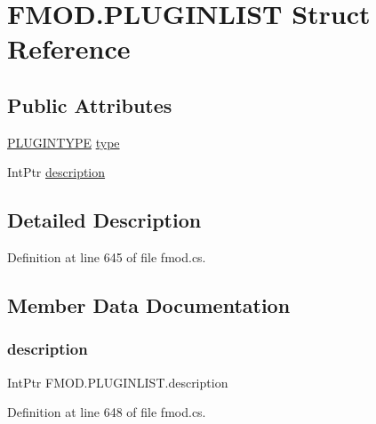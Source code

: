 \hypertarget{struct_f_m_o_d_1_1_p_l_u_g_i_n_l_i_s_t}{}\section{F\+M\+O\+D.\+P\+L\+U\+G\+I\+N\+L\+I\+ST Struct Reference}
\label{struct_f_m_o_d_1_1_p_l_u_g_i_n_l_i_s_t}
\subsection*{Public Attributes}
\begin{DoxyCompactItemize}
\item 
\hyperlink{namespace_f_m_o_d_ad838bca9e846c3461c840ea9865dfcea}{P\+L\+U\+G\+I\+N\+T\+Y\+PE} \hyperlink{struct_f_m_o_d_1_1_p_l_u_g_i_n_l_i_s_t_a4d1c97508aafa26b0e31cd25063830c7}{type}
\item 
Int\+Ptr \hyperlink{struct_f_m_o_d_1_1_p_l_u_g_i_n_l_i_s_t_aa31e5a3151d0f2ee810298f0a29268d7}{description}
\end{DoxyCompactItemize}


\subsection{Detailed Description}


Definition at line 645 of file fmod.\+cs.



\subsection{Member Data Documentation}
\mbox{\label{struct_f_m_o_d_1_1_p_l_u_g_i_n_l_i_s_t_aa31e5a3151d0f2ee810298f0a29268d7}} 
\subsubsection{\texorpdfstring{description}{description}}
{\footnotesize\ttfamily Int\+Ptr F\+M\+O\+D.\+P\+L\+U\+G\+I\+N\+L\+I\+S\+T.\+description}



Definition at line 648 of file fmod.\+cs.

